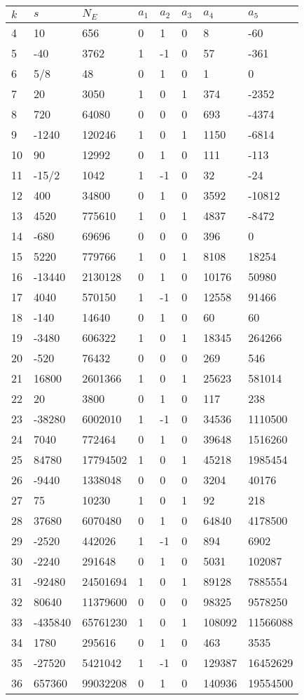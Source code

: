 \documentclass{amsart}
\begin{document}
\begin{longtable}{|l|l|l|lllll|}
\hline
$k$ & $s$ & $N_E$ & $a_1$ & $a_2$ & $a_3$ & $a_4$ & $a_5$\\
\hline
4&10&656&0&1&0&8&-60\\
5&-40&3762&1&-1&0&57&-361\\
6&5/8&48&0&1&0&1&0\\
7&20&3050&1&0&1&374&-2352\\
8&720&64080&0&0&0&693&-4374\\
9&-1240&120246&1&0&1&1150&-6814\\
10&90&12992&0&1&0&111&-113\\
11&-15/2&1042&1&-1&0&32&-24\\
12&400&34800&0&1&0&3592&-10812\\
13&4520&775610&1&0&1&4837&-8472\\
14&-680&69696&0&0&0&396&0\\
15&5220&779766&1&0&1&8108&18254\\
16&-13440&2130128&0&1&0&10176&50980\\
17&4040&570150&1&-1&0&12558&91466\\
18&-140&14640&0&1&0&60&60\\
19&-3480&606322&1&0&1&18345&264266\\
20&-520&76432&0&0&0&269&546\\
21&16800&2601366&1&0&1&25623&581014\\
22&20&3800&0&1&0&117&238\\
23&-38280&6002010&1&-1&0&34536&1110500\\
24&7040&772464&0&1&0&39648&1516260\\
25&84780&17794502&1&0&1&45218&1985454\\
26&-9440&1338048&0&0&0&3204&40176\\
27&75&10230&1&0&1&92&218\\
28&37680&6070480&0&1&0&64840&4178500\\
29&-2520&442026&1&-1&0&894&6902\\
30&-2240&291648&0&1&0&5031&102087\\
31&-92480&24501694&1&0&1&89128&7885554\\
32&80640&11379600&0&0&0&98325&9578250\\
33&-435840&65761230&1&0&1&108092&11566088\\
34&1780&295616&0&1&0&463&3535\\
35&-27520&5421042&1&-1&0&129387&16452629\\
36&657360&99032208&0&1&0&140936&19554500\\

\end{longtable}
\end{document}
